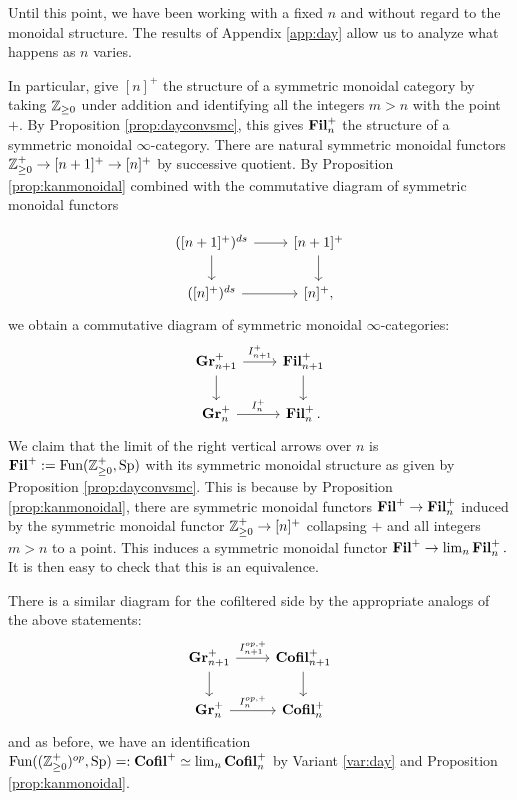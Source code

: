 
Until this point, we have been working with a fixed $n$ and without regard to the monoidal structure.  The results of Appendix \ref{app:day} allow us to analyze what happens as $n$ varies.   

In particular, give $[n]^+$ the structure of a symmetric monoidal category by taking $\operatorname{\mathbb{Z}}_{\geq 0}$ under addition and identifying all the integers $m >n$ with the point $+$.  By Proposition \ref{prop:dayconvsmc}, this gives $\operatorname{\textbf{Fil}}_n^+$ the structure of a symmetric monoidal $\infty$-category.  There are natural symmetric monoidal functors $\operatorname{\mathbb{Z}}_{\geq 0}^+ \to [n+1]^+ \to [n]^+$ by successive quotient.  By Proposition \ref{prop:kanmonoidal} combined with the commutative diagram of symmetric monoidal functors

$$
\begin{tikzcd}
(\lbrack n+1\rbrack^+)^{ds} \arrow[r] \arrow[d] & \lbrack n+1\rbrack^+ \arrow[d]\\
(\lbrack n\rbrack^+)^{ds} \arrow[r] & \lbrack n\rbrack^+ ,
\end{tikzcd}
$$
we obtain a commutative diagram of symmetric monoidal $\infty$-categories:
$$
\begin{tikzcd}
\Gr_{n+1}^+ \arrow[r,"I_{n+1}^+"] \arrow[d] & \Fil_{n+1}^+ \arrow[d]\\
\Gr_n^+  \arrow[r,"I_n^+"] & \Fil_n^+ .
\end{tikzcd}
$$
We claim that the limit of the right vertical arrows over $n$ is $\operatorname{\textbf{Fil}}^+ := \operatorname{\text{Fun}}(\operatorname{\mathbb{Z}}_{\geq 0}^+,\operatorname{\text{Sp}})$ with its symmetric monoidal structure as given by Proposition \ref{prop:dayconvsmc}.  This is because by Proposition \ref{prop:kanmonoidal}, there are symmetric monoidal functors $\operatorname{\textbf{Fil}}^+ \to \operatorname{\textbf{Fil}}_n^+$ induced by the symmetric monoidal functor $\operatorname{\mathbb{Z}}_{\geq 0}^+ \to [n]^+$ collapsing $+$ and all integers $m> n$ to a point.  This induces a symmetric monoidal functor $\operatorname{\textbf{Fil}}^+ \to \lim_n \operatorname{\textbf{Fil}}_n^{+}.$  It is then easy to check that this is an equivalence.  

There is a similar diagram for the cofiltered side by the appropriate analogs of the above statements:
$$
\begin{tikzcd}
\Gr_{n+1}^+ \arrow[r,"I_{n+1}^{op,+}"] \arrow[d] & \Cofil_{n+1}^+ \arrow[d]\\
\Gr_n^+  \arrow[r,"I_n^{op,+}"] & \Cofil_n^+ 
\end{tikzcd}
$$
and as before, we have an identification $ \operatorname{\text{Fun}}((\operatorname{\mathbb{Z}}_{\geq 0}^{+})^{op}, \operatorname{\text{Sp}}) =: \operatorname{\textbf{Cofil}}^+ \simeq \lim_n \operatorname{\textbf{Cofil}}_n^+$ by Variant \ref{var:day} and Proposition \ref{prop:kanmonoidal}.

